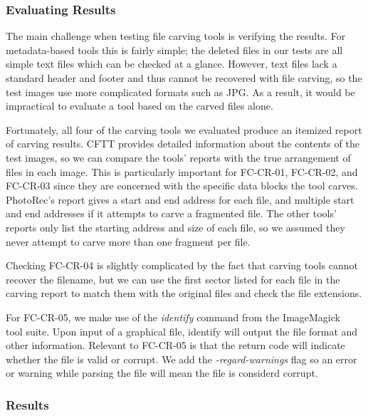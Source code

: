 \subsubsection{Evaluating Results}
The main challenge when testing file carving tools is verifying the results. 
For metadata-based tools this is fairly simple; the deleted files in our tests are all simple text files which can be checked at a glance.
However, text files lack a standard header and footer and thus cannot be recovered with file carving, so the test images use more complicated formats such as JPG.
As a result, it would be impractical to evaluate a tool based on the carved files alone.

Fortunately, all four of the carving tools we evaluated produce an itemized report of carving results. CFTT provides detailed information about the contents of the test images, so we can compare the tools' reports with the true arrangement of files in each image. This is particularly important for FC-CR-01, FC-CR-02, and FC-CR-03 since they are concerned with the specific data blocks the tool carves. PhotoRec's report gives a start and end address for each file, and multiple start and end addresses if it attempts to carve a fragmented file. The other tools' reports only list the starting address and size of each file, so we assumed they never attempt to carve more than one fragment per file.

Checking FC-CR-04 is slightly complicated by the fact that carving tools cannot recover the filename, but we can use the first sector listed for each file in the carving report to match them with the original files and check the file extensions.

For FC-CR-05, we make use of the \emph{identify} command from the ImageMagick~\cite{imagemagick} tool suite. Upon input of a graphical file, identify will output the file format and other information. Relevant to FC-CR-05 is that the return code will indicate whether the file is valid or corrupt. We add the \emph{-regard-warnings} flag so an error or warning while parsing the file will mean the file is considerd corrupt.

\subsubsection{Results}

